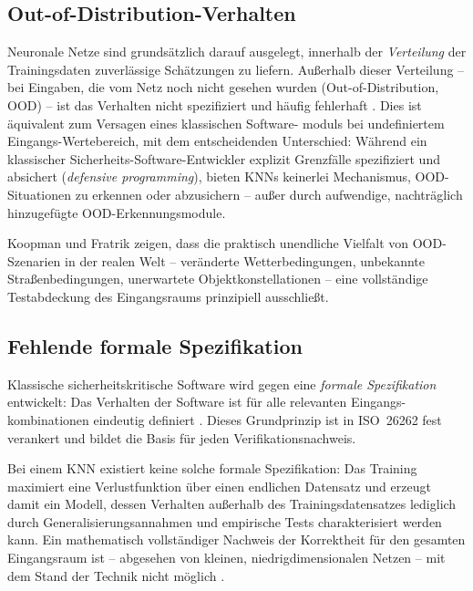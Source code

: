 ﻿\documentclass[12pt,a4paper]{article}
\begin{document}
\subsection{Out-of-Distribution-Verhalten}
\label{subsec:ood}

Neuronale Netze sind grunds\"atzlich darauf ausgelegt, innerhalb der \emph{Verteilung}
der Trainingsdaten zuverl\"assige Sch\"atzungen zu liefern. Au\ss{}erhalb dieser
Verteilung -- bei Eingaben, die vom Netz noch nicht gesehen wurden (Out-of-Distribution,
OOD) -- ist das Verhalten nicht spezifiziert und h\"aufig fehlerhaft
\cite{Amodei2016}. Dies ist \"aquivalent zum Versagen eines klassischen Software-
moduls bei undefiniertem Eingangs-Wertebereich, mit dem entscheidenden Unterschied:
W\"ahrend ein klassischer Sicherheits-Software-Entwickler explizit Grenzf\"alle
spezifiziert und absichert (\emph{defensive programming}), bieten KNNs keinerlei
Mechanismus, OOD-Situationen zu erkennen oder abzusichern -- au\ss{}er durch
aufwendige, nachtr\"aglich hinzugef\"ugte OOD-Erkennungsmodule.

Koopman und Fratrik \cite{Koopman2019} zeigen, dass die praktisch unendliche
Vielfalt von OOD-Szenarien in der realen Welt -- ver\"anderte Wetterbedingungen,
unbekannte Stra\ss{}enbedingungen, unerwartete Objektkonstellationen -- eine
vollst\"andige Testabdeckung des Eingangsraums prinzipiell ausschlie\ss{}t.

\subsection{Fehlende formale Spezifikation}
\label{subsec:formale_spez}

Klassische sicherheitskritische Software wird gegen eine \emph{formale Spezifikation}
entwickelt: Das Verhalten der Software ist f\"ur alle relevanten Eingangs-
kombinationen eindeutig definiert \cite{Seshia2018}. Dieses Grundprinzip ist in
ISO~26262 fest verankert und bildet die Basis f\"ur jeden Verifikationsnachweis.

Bei einem KNN existiert keine solche formale Spezifikation: Das Training
maximiert eine Verlustfunktion \"uber einen endlichen Datensatz und erzeugt
damit ein Modell, dessen Verhalten au\ss{}erhalb des Trainingsdatensatzes
lediglich durch Generalisierungsannahmen und empirische Tests charakterisiert
werden kann. Ein mathematisch vollst\"andiger Nachweis der Korrektheit
f\"ur den gesamten Eingangsraum ist -- abgesehen von kleinen, niedrigdimensionalen
Netzen -- mit dem Stand der Technik nicht m\"oglich \cite{Huang2017}.
\end{document}
